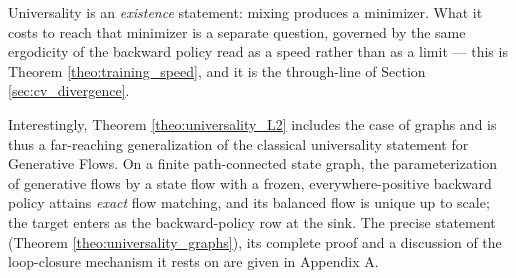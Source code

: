 Universality is an \emph{existence} statement: mixing produces a minimizer. What it costs to reach that minimizer is a separate question, governed by the same ergodicity of the backward policy read as a speed rather than as a limit --- this is Theorem \ref{theo:training_speed}, and it is the through-line of Section \ref{sec:cv_divergence}.

Interestingly, Theorem \ref{theo:universality_L2} includes the case of graphs and is thus a far-reaching generalization of the classical universality statement for Generative Flows. On a finite path-connected state graph, the parameterization of generative flows by a state flow with a frozen, everywhere-positive backward policy \cite{morozov2025revisiting} attains \emph{exact} flow matching, and its balanced flow is unique up to scale; the target enters as the backward-policy row at the sink. The precise statement (Theorem \ref{theo:universality_graphs}), its complete proof and a discussion of the loop-closure mechanism it rests on are given in Appendix A.
